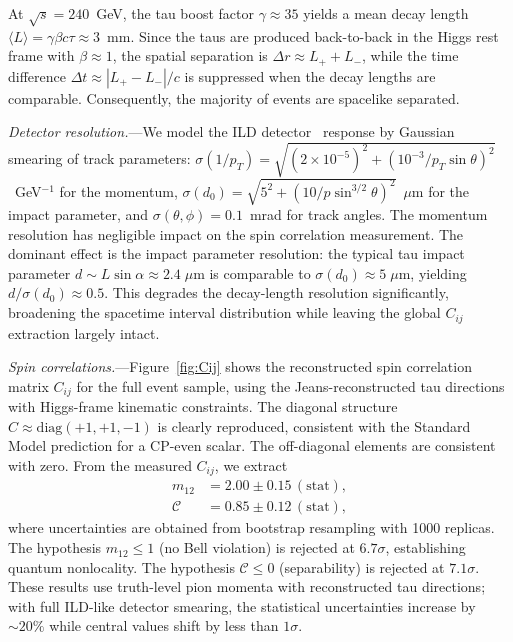 \documentclass[prl,twocolumn,superscriptaddress,floatfix]{revtex4-2}
\newcommand{\mtwo}{m_{12}}
\newcommand{\sqrts}{\sqrt{s}}
\begin{document}
At $\sqrts=240$~GeV, the tau boost factor $\gamma\approx 35$ yields a
mean decay length $\langle L\rangle = \gamma\beta c\tau \approx 3$~mm.
Since the taus are produced back-to-back in the Higgs rest frame with
$\beta\approx 1$, the spatial separation is
$\Delta r \approx L_+ + L_-$, while the time difference
$\Delta t \approx |L_+ - L_-|/c$ is suppressed when the decay
lengths are comparable. Consequently, the majority of events are
spacelike separated.

\textit{Detector resolution.}---We model the ILD
detector~\cite{ILD_IDR} response by Gaussian smearing of track parameters:
$\sigma(1/p_T) = \sqrt{(2\!\times\!10^{-5})^2 + (10^{-3}/p_T\!\sin\theta)^2}$~GeV$^{-1}$
for the momentum, $\sigma(d_0) = \sqrt{5^2 + (10/p\!\sin^{3/2}\!\theta)^2}$~$\mu$m
for the impact parameter, and $\sigma(\theta,\phi) = 0.1$~mrad for
track angles.  The momentum resolution has negligible impact on the
spin correlation measurement.  The dominant effect is the impact
parameter resolution: the typical tau impact parameter
$d \sim L\!\sin\alpha \approx 2.4\;\mu$m is comparable to
$\sigma(d_0)\approx 5\;\mu$m, yielding $d/\sigma(d_0)\approx 0.5$.
This degrades the decay-length resolution significantly, broadening the
spacetime interval distribution while leaving the global $C_{ij}$
extraction largely intact.


\textit{Spin correlations.}---Figure~\ref{fig:Cij} shows the
reconstructed spin correlation matrix $C_{ij}$ for the full event
sample, using the Jeans-reconstructed tau directions with Higgs-frame
kinematic constraints.  The diagonal structure
$C\approx\mathrm{diag}(+1,+1,-1)$ is clearly reproduced, consistent
with the Standard Model prediction for a CP-even scalar.  The
off-diagonal elements are consistent with zero.  From the measured
$C_{ij}$, we extract
\begin{align}
  \mtwo &= 2.00 \pm 0.15\,(\mathrm{stat}), \label{eq:m12_result}\\
  \mathcal{C} &= 0.85 \pm 0.12\,(\mathrm{stat}),
  \label{eq:conc_result}
\end{align}
where uncertainties are obtained from bootstrap resampling with 1000
replicas.  The hypothesis $\mtwo\leq 1$ (no Bell violation) is rejected
at $6.7\sigma$, establishing quantum nonlocality.  The hypothesis
$\mathcal{C}\leq 0$ (separability) is rejected at $7.1\sigma$.
These results use truth-level pion momenta with reconstructed tau
directions; with full ILD-like detector smearing, the statistical
uncertainties increase by ${\sim}20\%$ while central values shift by
less than $1\sigma$.
\end{document}
